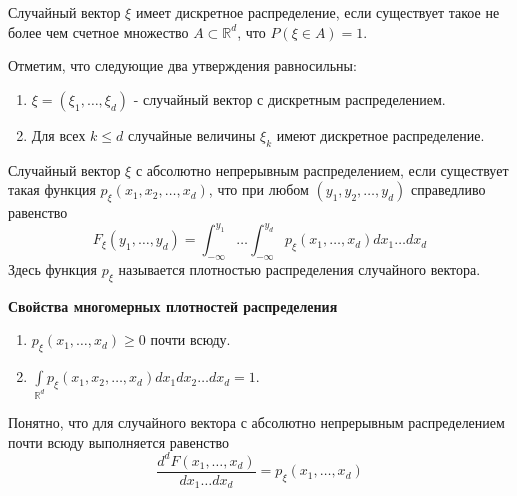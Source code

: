 \begin{definition}
	Случайный вектор $\xi$ имеет дискретное распределение, если существует такое не более чем счетное множество $A \subset \mathbb{R}^d$, что $P(\xi \in A) = 1$.
	
	Отметим, что следующие два утверждения равносильны:
	\begin{enumerate}
		\item $\xi = (\xi_1, \dots, \xi_d)$ - случайный вектор с дискретным распределением.
		\item Для всех $k \le d$ случайные величины $\xi_k$ имеют дискретное распределение.
	\end{enumerate}
\end{definition}

\begin{definition}
	Случайный вектор $\xi$ с абсолютно непрерывным распределением, если существует такая функция $p_{\xi} (x_1, x_2, \dots, x_d)$, что при любом $(y_1, y_2, \dots, y_d)$ справедливо равенство
	\[ F_{\xi} (y_1, \dots, y_d) = \int_{-\infty}^{y_1} \dots \int_{-\infty}^{y_d} p_{\xi} (x_1, \dots, x_d) dx_1 \dots dx_d \]
	Здесь функция $p_{\xi}$ называется плотностью распределения случайного вектора.
\end{definition}

\begin{center}
	\textbf{Свойства многомерных плотностей распределения}
\end{center}
\begin{enumerate}
	\item $p_{\xi} (x_1, \dots, x_d) \ge 0$ почти всюду.
	\item $\int\limits_{\mathbb{R}^d} p_{\xi} (x_1, x_2, \dots, x_d) dx_1 dx_2 \dots dx_d = 1$.
\end{enumerate}
Понятно, что для случайного вектора с абсолютно непрерывным распределением почти всюду выполняется равенство
\[ \frac{d^d F(x_1, \dots, x_d)}{dx_1 \dots dx_d} = p_{\xi} (x_1, \dots, x_d) \]

